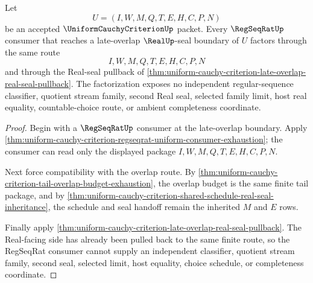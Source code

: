 \begin{theorem}
\label{thm:uniform-cauchy-criterion-late-overlap-regseqrat-consumer-factorization}
Let
$$
U=(I,W,M,Q,T,E,H,C,P,N)
$$
be an accepted $\UniformCauchyCriterionUp$ packet. Every $\RegSeqRatUp$ consumer that reaches a late-overlap $\RealUp$-seal boundary of $U$ factors through the same route
$$
I,W,M,Q,T,E,H,C,P,N
$$
and through the Real-seal pullback of \autoref{thm:uniform-cauchy-criterion-late-overlap-real-seal-pullback}. The factorization exposes no independent regular-sequence classifier, quotient stream family, second Real seal, selected family limit, host real equality, countable-choice route, or ambient completeness coordinate.
\end{theorem}
\begin{proof}
Begin with a $\RegSeqRatUp$ consumer at the late-overlap boundary. Apply \autoref{thm:uniform-cauchy-criterion-regseqrat-uniform-consumer-exhaustion}; the consumer can read only the displayed package $I,W,M,Q,T,E,H,C,P,N$.

Next force compatibility with the overlap route. By \autoref{thm:uniform-cauchy-criterion-tail-overlap-budget-exhaustion}, the overlap budget is the same finite tail package, and by \autoref{thm:uniform-cauchy-criterion-shared-schedule-real-seal-inheritance}, the schedule and seal handoff remain the inherited $M$ and $E$ rows.

Finally apply \autoref{thm:uniform-cauchy-criterion-late-overlap-real-seal-pullback}. The Real-facing side has already been pulled back to the same finite route, so the RegSeqRat consumer cannot supply an independent classifier, quotient stream family, second seal, selected limit, host equality, choice schedule, or completeness coordinate.
\end{proof}

